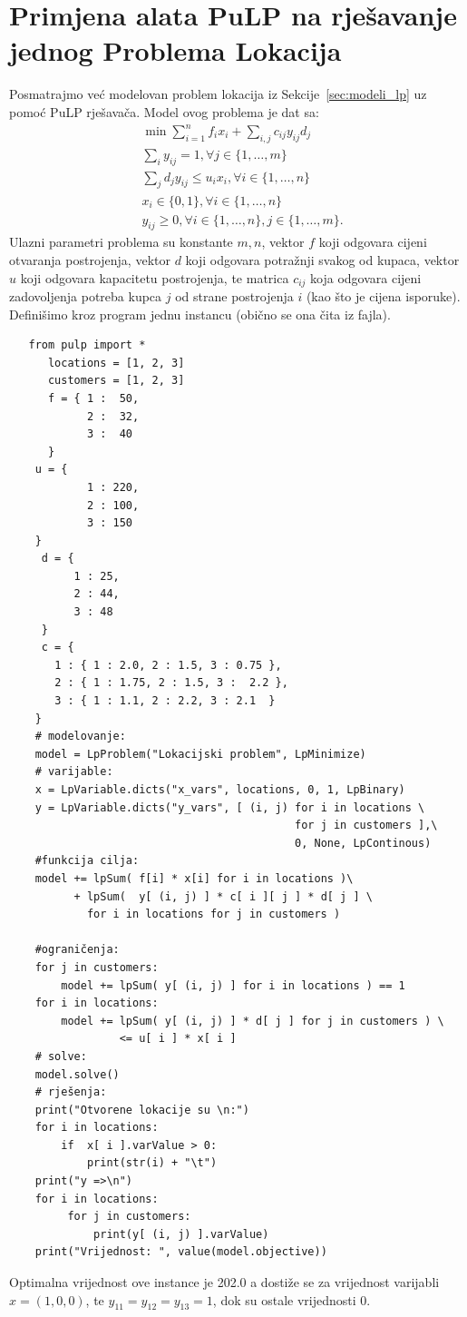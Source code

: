 \documentclass[a4paper, utf8, 11pt, colorlinks]{book}
\begin{document}
 \section{Primjena alata PuLP na rješavanje jednog Problema Lokacija}%
 Posmatrajmo već modelovan problem lokacija iz Sekcije~\ref{sec:modeli_lp} uz pomoć PuLP rješavača. Model ovog problema je dat sa:
 \begin{align*}
 	   & \min \sum_{i=1}^n f_i x_i  + \sum_{i,j} c_{ij} y_{ij} d_j  \\
 	   & \sum_{i} y_{ij} = 1, \forall j\in\{1,\ldots,m\} \\
 	   & \sum_{j} d_j y_{ij} \leq u_i x_i, \forall i \in \{1,\ldots,n\} \\
 	   & x_i \in \{0, 1\}, \forall i \in \{1, \ldots, n\} \\
 	   & y_{ij} \geq 0, \forall i \in \{1,\ldots,n \}, j \in \{1, \ldots, m\}.
 \end{align*}
 Ulazni parametri problema su konstante $m, n$, vektor $f$ koji odgovara cijeni otvaranja postrojenja, vektor $d$ koji odgovara potražnji svakog od kupaca, vektor $u$ koji odgovara kapacitetu postrojenja, te matrica $c_{ij}$ koja 
 odgovara cijeni zadovoljenja potreba kupca $j$ od strane postrojenja $i$ (kao što je cijena isporuke).  Definišimo kroz program jednu instancu (obično se ona čita iz fajla). 
 \begin{verbatim}
   from pulp import *
 	  locations = [1, 2, 3]
 	  customers = [1, 2, 3]
 	  f = { 1 :  50,
 	        2 :  32,
 	        3 :  40 
 	  }
    u = {
            1 : 220,
            2 : 100,
            3 : 150
    }
     d = {
          1 : 25,
          2 : 44,
          3 : 48
     }
     c = {
       1 : { 1 : 2.0, 2 : 1.5, 3 : 0.75 },
       2 : { 1 : 1.75, 2 : 1.5, 3 :  2.2 },  
       3 : { 1 : 1.1, 2 : 2.2, 3 : 2.1  }
    }
    # modelovanje:
    model = LpProblem("Lokacijski problem", LpMinimize) 
    # varijable:
    x = LpVariable.dicts("x_vars", locations, 0, 1, LpBinary)
    y = LpVariable.dicts("y_vars", [ (i, j) for i in locations \ 
                                            for j in customers ],\  
                                            0, None, LpContinous)
    #funkcija cilja: 
    model += lpSum( f[i] * x[i] for i in locations )\ 
          + lpSum(  y[ (i, j) ] * c[ i ][ j ] * d[ j ] \ 
            for i in locations for j in customers )
   
    #ograničenja:
    for j in customers:
        model += lpSum( y[ (i, j) ] for i in locations ) == 1
    for i in locations: 
        model += lpSum( y[ (i, j) ] * d[ j ] for j in customers ) \ 
                 <= u[ i ] * x[ i ]
    # solve:
    model.solve()
    # rješenja:
    print("Otvorene lokacije su \n:")
    for i in locations:
        if  x[ i ].varValue > 0:
            print(str(i) + "\t")
    print("y =>\n")
    for i in locations:
         for j in customers:
             print(y[ (i, j) ].varValue)
    print("Vrijednost: ", value(model.objective))    
 \end{verbatim}
 Optimalna vrijednost ove instance je 202.0 a dostiže se za vrijednost varijabli $x = (1, 0, 0)$, te $y_{11}= y_{12}= y_{13} = 1$, dok su ostale vrijednosti 0.
\end{document}
